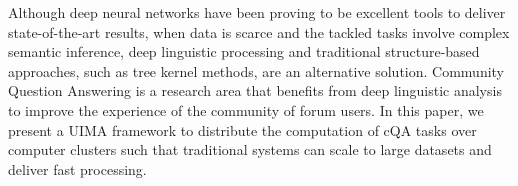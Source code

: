 Although deep neural networks have been proving to be excellent tools to deliver state-of-the-art results, when data is scarce and the tackled tasks involve complex semantic inference, deep linguistic processing and traditional structure-based approaches, such as tree kernel methods, are an alternative solution. Community Question Answering is a research area that benefits from deep linguistic analysis to improve the experience of the community of forum users. In this paper, we present a UIMA framework to distribute the computation of cQA tasks over computer clusters such that traditional systems can scale to large datasets and deliver fast processing.
